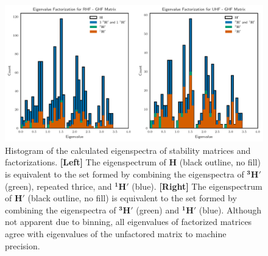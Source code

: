 \documentclass{revtex4}
\begin{document}
\begin{figure}[h]\label{histograms}
  \includegraphics[width=\linewidth]{../../images/matrix_factor_histograms.pdf}
  \caption{ Histogram of the calculated eigenspectra of stability matrices and factorizations. 
  \newline \textbf{[Left]} The eigenspectrum of $\mathbf{H}$ (black outline, no fill) is equivalent 
  to the 
  set formed by combining the eigenspectra of $\mathbf{{}^3H'}$ (green), repeated thrice, and 
  $\mathbf{{}^1H'}$ 
  (blue).
  \newline \textbf{[Right]} The eigenspectrum of $\mathbf{H'}$ (black outline, no fill) is 
  equivalent to the 
  set formed by combining the eigenspectra of $\mathbf{{}^3H'}$ (green) and $\mathbf{{}^1H'}$ 
  (blue).  
  \newline Although not apparent due to binning, all eigenvalues of factorized matrices agree
  with eigenvalues of the unfactored matrix to machine precision. 
  }
\end{figure}
\end{document}
